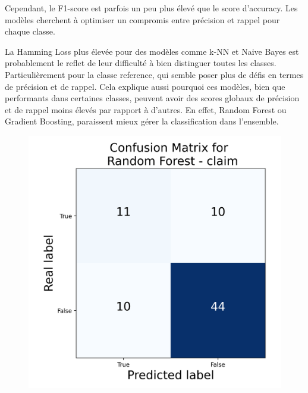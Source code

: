 Cependant, le F1-score est parfois un peu plus élevé que le score d'accuracy.
Les modèles cherchent à optimiser un compromis entre précision et rappel pour chaque classe.

\noindent La Hamming Loss plus élevée pour des modèles comme k-NN et Naive Bayes est probablement le reflet de leur difficulté à bien distinguer toutes les classes.
Particulièrement pour la classe reference, qui semble poser plus de défis en termes de précision et de rappel.
Cela explique aussi pourquoi ces modèles, bien que performants dans certaines classes, peuvent avoir des scores globaux de précision et de rappel moins élevés par rapport à d'autres.
En effet, Random Forest ou Gradient Boosting, paraissent mieux gérer la classification dans l’ensemble.

\vfill
\begin{figure}[h]
    \centering
    \begin{minipage}[b]{0.33\textwidth}
        \centering
        \includegraphics[width=\textwidth]{images/confusion_3.json-Random Forest_claim_confusion_matrix}
        \label{fig:confusion_3_1}
    \end{minipage}
    \hspace{-1em}
    \begin{minipage}[b]{0.33\textwidth}
        \centering

\end{minipage}
\end{figure}
